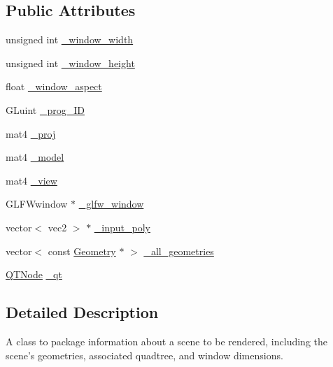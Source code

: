 \subsection*{Public Attributes}
\begin{DoxyCompactItemize}
\item 
unsigned int \hyperlink{class_scene_a9857688fb9c3a52be5e6b7551d7e3af8}{\+\_\+window\+\_\+width}
\item 
unsigned int \hyperlink{class_scene_a4a9a7b4b69981efd9ffddfb7d4205806}{\+\_\+window\+\_\+height}
\item 
float \hyperlink{class_scene_aa5d5f322f50e6518e88501fa5481eca9}{\+\_\+window\+\_\+aspect}
\item 
G\+Luint \hyperlink{class_scene_a30e431c913372130cd9f97c0c1e3d75e}{\+\_\+prog\+\_\+\+I\+D}
\item 
mat4 \hyperlink{class_scene_a7e980fe501bcaf6f173497d0a2190887}{\+\_\+proj}
\item 
mat4 \hyperlink{class_scene_a2eea7478321942ad8f26f4555e1202c9}{\+\_\+model}
\item 
mat4 \hyperlink{class_scene_ae1b9af3642d66e6eff7d849c20aafdc5}{\+\_\+view}
\item 
G\+L\+F\+Wwindow $\ast$ \hyperlink{class_scene_a90aeef6966c87169d2adfb161772c2c3}{\+\_\+glfw\+\_\+window}
\item 
vector$<$ vec2 $>$ $\ast$ \hyperlink{class_scene_a28b649d5aa339d6783672045f8026476}{\+\_\+input\+\_\+poly}
\item 
vector$<$ const \hyperlink{class_geometry}{Geometry} $\ast$ $>$ \hyperlink{class_scene_ae4e39aee440d748c4dc14a5aad13825d}{\+\_\+all\+\_\+geometries}
\item 
\hyperlink{class_q_t_node}{Q\+T\+Node} \hyperlink{class_scene_af49afd50369f23c12d70c6fe07c9b797}{\+\_\+qt}
\end{DoxyCompactItemize}


\subsection{Detailed Description}
A class to package information about a scene to be rendered, including the scene's geometries, associated quadtree, and window dimensions. 

